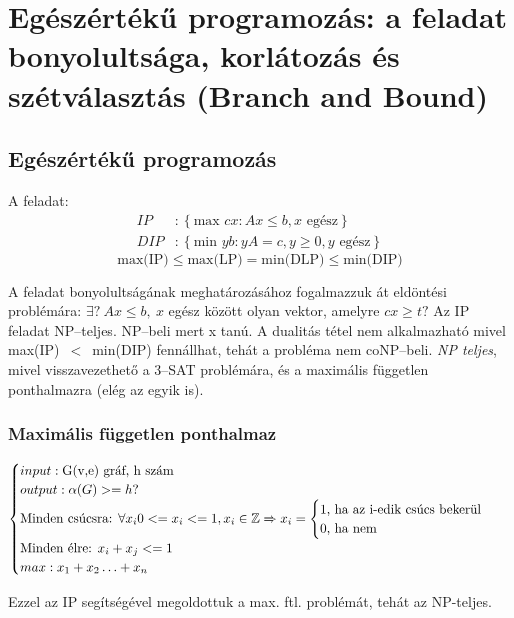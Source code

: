 \skiptooddpage
\section[Egészértékű programozás]{Egészértékű programozás: a feladat bonyolultsága, korlátozás és szétválasztás (Branch and Bound)}

\subsection{Egészértékű programozás}
A feladat:
\begin{align*}
	IP  & : \left\{\mbox{max }{cx: Ax \leq b, x \mbox{ egész}}\right\}       \\
	DIP & : \left\{ \mbox{min }{yb: yA=c, y \geq 0, y \mbox{ egész}}\right\}
\end{align*}
\[ \mbox{max(IP)} \leq \mbox{max(LP)}= \mbox{min(DLP)} \leq \mbox{min(DIP)} \]

A feladat bonyolultságának meghatározásához fogalmazzuk át eldöntési problémára:
$\exists?~Ax \leq b,~ x$ egész között olyan vektor, amelyre $cx \geq t?$ Az IP
feladat NP--teljes. NP--beli mert x tanú. A dualitás tétel nem alkalmazható
mivel max(IP)~$<$~min(DIP) fennállhat, tehát a probléma nem coNP--beli.
\emph{NP teljes}, mivel visszavezethető a $3$--SAT problémára, és a maximális
független ponthalmazra (elég az egyik is).

\subsubsection{Maximális független ponthalmaz}

$ \begin{cases}
		input: \mbox{G(v,e) gráf, h szám}          \\
		output: \alpha (G) >= h?                   \\
		\mbox{Minden csúcsra: }
		\forall x_i 0 <= x_i <= 1, x_i \in \mathbb{Z}
		\xRightarrow{}
		x_i = \begin{cases}
			      \mbox{1, ha az i-edik csúcs bekerül} \\
			      \mbox{0, ha nem}
		      \end{cases} \\
		\mbox{Minden élre: }
		x_i + x_j <= 1                             \\
		max: x_1 + x_2 \ldots + x_n
	\end{cases}$

Ezzel az IP segítségével megoldottuk a max. ftl. problémát, tehát az NP-teljes.

